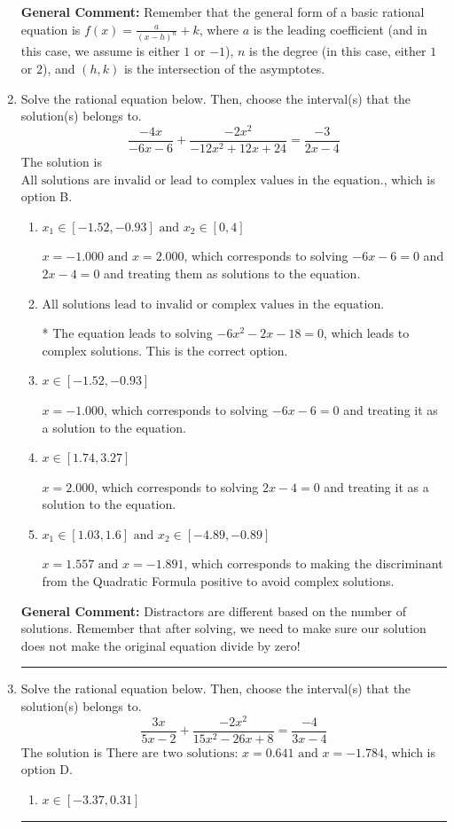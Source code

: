 \documentclass{extbook}[14pt]
\newcommand{\litem}[1]{\item #1

\rule{\textwidth}{0.4pt}}
\begin{document}
\begin{enumerate}
{\textbf{General Comment:} Remember that the general form of a basic rational equation is $ f(x) = \frac{a}{(x-h)^n} + k$, where $a$ is the leading coefficient (and in this case, we assume is either $1$ or $-1$), $n$ is the degree (in this case, either $1$ or $2$), and $(h, k)$ is the intersection of the asymptotes.
}
\litem{
Solve the rational equation below. Then, choose the interval(s) that the solution(s) belongs to.
\[ \frac{-4x}{-6x -6} + \frac{-2x^{2}}{-12x^{2} +12 x + 24} = \frac{-3}{2x -4} \]The solution is \( \text{All solutions are invalid or lead to complex values in the equation.} \), which is option B.\begin{enumerate}[label=\Alph*.]
\item \( x_1 \in [-1.52, -0.93] \text{ and } x_2 \in [0,4] \)

$x = -1.000 \text{ and } x = 2.000$, which corresponds to solving $-6x -6 = 0$ and $2x -4 = 0$ and treating them as solutions to the equation.
\item \( \text{All solutions lead to invalid or complex values in the equation.} \)

* The equation leads to solving $-6x^{2} -2 x -18=0$, which leads to complex solutions. This is the correct option.
\item \( x \in [-1.52,-0.93] \)

$x = -1.000$, which corresponds to solving $-6x -6 = 0$ and treating it as a solution to the equation.
\item \( x \in [1.74,3.27] \)

$x = 2.000$, which corresponds to solving $2x -4 = 0$ and treating it as a solution to the equation.
\item \( x_1 \in [1.03, 1.6] \text{ and } x_2 \in [-4.89,-0.89] \)

$x = 1.557 \text{ and } x = -1.891$, which corresponds to making the discriminant from the Quadratic Formula positive to avoid complex solutions.
\end{enumerate}

\textbf{General Comment:} Distractors are different based on the number of solutions. Remember that after solving, we need to make sure our solution does not make the original equation divide by zero!
}
\litem{
Solve the rational equation below. Then, choose the interval(s) that the solution(s) belongs to.
\[ \frac{3x}{5x -2} + \frac{-2x^{2}}{15x^{2} -26 x + 8} = \frac{-4}{3x -4} \]The solution is \( \text{There are two solutions: } x = 0.641 \text{ and } x = -1.784 \), which is option D.\begin{enumerate}[label=\Alph*.]
\item \( x \in [-3.37,0.31] \)



\end{enumerate}}
\end{enumerate}
\end{document}
